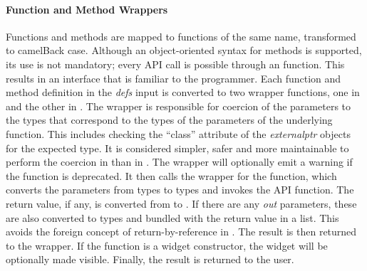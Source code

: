 \documentclass[article]{jss}
\begin{document}
\paragraph{Function and Method Wrappers}

Functions and methods are mapped to  functions of the same name, 
transformed to camelBack case. Although an object-oriented
syntax for methods is supported, its use is not mandatory; every API call
is possible through an  function. This results in an interface
that is familiar to the  programmer. Each function and method 
definition in the \emph{defs} input is converted
to two wrapper functions, one in  and the other in . 
The  wrapper is responsible for coercion of the parameters to
the  types that correspond to the  types of the parameters
of the underlying  function. This includes checking the ``class''
attribute of the \emph{externalptr} objects for the expected type. 
It is considered simpler, safer and more
maintainable to perform the coercion in  than in . The 
 wrapper will optionally emit a warning if the function is deprecated.
It then calls the  wrapper for the function, which 
converts the parameters from  types to  types and
invokes the API function. The return value, if any, is converted from 
to . If there are any \emph{out} parameters, these are also converted
to  types and bundled with the return value in a list. This avoids 
the foreign concept of return-by-reference in . The result
is then returned to the  wrapper. If the function is a widget
constructor, the widget will be optionally made visible. Finally, the result
is returned to the user.
\end{document}
